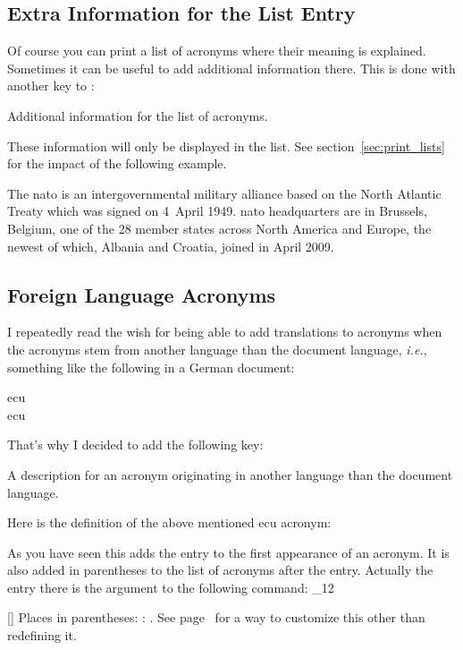 \documentclass[load-preamble+]{cnltx-doc}
\makeatletter
\newcommand*\latin{\textit}
\renewenvironment{commands}
  {%
    \cnltx@set@catcode_{12}%
    \let\command\cnltx@command
    \cnltxlist
  }
  {\endcnltxlist}
\makeatother
\begin{document}
\subsection{Extra Information for the List Entry}
Of course you can print a list of acronyms where their meaning is explained.
Sometimes it can be useful to add additional information there.  This is done
with another key to :
\begin{options}
    Additional information for the list of acronyms.
\end{options}
These information will only be displayed in the list.  See
section~\ref{sec:print_lists} for the impact of the following example.

\begin{example}
  The \ac{nato} is an intergovernmental military alliance based on the
  North Atlantic Treaty which was signed on 4~April 1949. \ac{nato}
  headquarters are in Brussels, Belgium, one of the 28 member states
  across North America and Europe, the newest of which, Albania and
  Croatia, joined in April 2009.
\end{example}

\subsection{Foreign Language Acronyms}\label{ssec:foreign}
\noindent{}I repeatedly read the wish for being able to add
translations to acronyms when the acronyms stem from another language than the
document language, \latin{i.e.}, something like the following in a German 
document:
\begin{example}
  \ac{ecu}\\
  \ac{ecu}
\end{example}
That's why I decided to add the following key:
\begin{options}
    A description for an acronym originating in another language than the
    document language.
\end{options}

Here is the definition of the above mentioned \ac{ecu} acronym:
\begin{sourcecode}
\end{sourcecode}
As you have seen this adds the  entry to the first appearance
of an acronym.  It is also added in parentheses to the list of acronyms after
the  entry.  Actually the entry there is the argument to the
following command:
\begin{commands}
  \command{acroenparen}[]
    Places  in parentheses: :
    .  See page~\pageref{key:list-foreign-format} for a
    way to customize this other than redefining it.
\end{commands}
\end{document}
